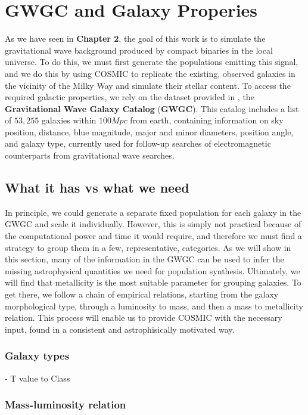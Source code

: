 \chapter{GWGC and Galaxy Properies}
As we have seen in \textbf{Chapter 2}, the goal of this work is to simulate the gravitational wave background produced by compact binaries in the local universe.
To do this, we must first generate the populations emitting this signal, and we do this by using COSMIC to replicate the existing, observed galaxies in the vicinity of the Milky Way and simulate their stellar content.
To access the required galactic properties, we rely on the dataset provided in \cite{GWGC}, the \textbf{Gravitational Wave Galaxy Catalog} (\textbf{GWGC}).
This catalog includes a list of $53,255$ galaxies within $100Mpc$ from earth, containing information on sky position, distance, blue magnitude, major and minor diameters, position angle, and galaxy type, currently used for follow-up searches of electromagnetic counterparts from gravitational wave searches.

\section{What it has vs what we need}
In principle, we could generate a separate fixed population for each galaxy in the GWGC and scale it individually.
However, this is simply not practical because of the computational power and time it would require, and therefore we must find a strategy to group them in a few, representative, categories.
As we will show in this section, many of the information in the GWGC can be used to infer the missing astrophysical quantities we need for population synthesis. 
Ultimately, we will find that metallicity is the most suitable parameter for grouping galaxies.
To get there, we follow a chain of empirical relations, starting from the galaxy morphological type, through  a luminosity to mass, and then a mass to metallicity relation. 
This process will enable us to provide COSMIC with the necessary input, found in a consistent and astrophisically motivated way.

\subsection{Galaxy types}

    - T value to Class

\subsection{Mass-luminosity relation}

